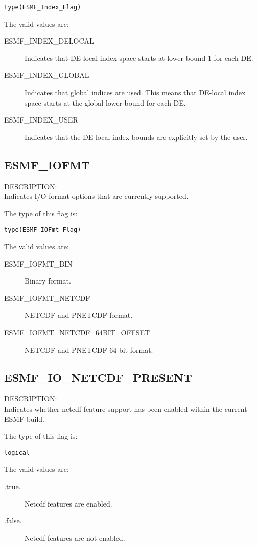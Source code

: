 {\tt type(ESMF\_Index\_Flag)}

The valid values are:
\begin{description}
\item [ESMF\_INDEX\_DELOCAL]
      Indicates that DE-local index space starts at lower bound 1 for each DE.
\item [ESMF\_INDEX\_GLOBAL]
      Indicates that global indices are used. This means that DE-local index
      space starts at the global lower bound for each DE.
\item [ESMF\_INDEX\_USER]
      Indicates that the DE-local index bounds are explicitly set by the user.
 \end{description}

\subsection{ESMF\_IOFMT}
\label{opt:iofmtflag}
{\sf DESCRIPTION:\\}
Indicates I/O format options that are currently supported.

The type of this flag is:

{\tt type(ESMF\_IOFmt\_Flag)}

The valid values are:
\begin{description}
\item [ESMF\_IOFMT\_BIN]
      Binary format.
\item [ESMF\_IOFMT\_NETCDF]
      NETCDF and PNETCDF format.
\item [ESMF\_IOFMT\_NETCDF\_64BIT\_OFFSET]
      NETCDF and PNETCDF 64-bit format.
\end{description}

\subsection{ESMF\_IO\_NETCDF\_PRESENT}
\label{const:ionetcdfflag}
{\sf DESCRIPTION:\\}
Indicates whether netcdf feature support has been enabled
within the current ESMF build.

The type of this flag is:

{\tt logical}

The valid values are:
\begin{description}
\item [.true.]
      Netcdf features are enabled.
\item [.false.]
      Netcdf features are not enabled.
\end{description}

